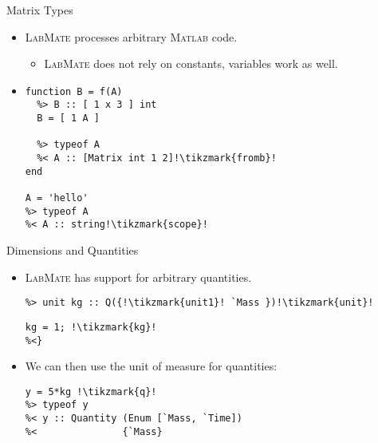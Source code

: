\documentclass[]{beamer}
\newcommand{\tikzmark}[1]{\tikz[overlay,remember picture,baseline=-0.5ex] \node (#1) {};}
\newcommand{\lm}{\textsc{LabMate}\xspace}
\newcommand{\ma}{\textsc{Matlab}\xspace}
\begin{document}
\begin{frame}[fragile]{Matrix Types}
  \begin{itemize}[<+->]
  \item \lm processes arbitrary \ma code.
    \smallskip
    \begin{itemize}
    \item \lm does not rely on constants, variables work as well.
    \end{itemize}
  \item
\begin{lstlisting}[xleftmargin=0em]
function B = f(A)
  %> B :: [ 1 x 3 ] int
  B = [ 1 A ]

  %> typeof A
  %< A :: [Matrix int 1 2]!\tikzmark{fromb}!
end

A = 'hello'
%> typeof A
%< A :: string!\tikzmark{scope}!
\end{lstlisting}
   \pause
  \end{itemize}
\end{frame}

\begin{frame}[fragile]{Dimensions and Quantities}
  \begin{itemize}[<+->]
  \item \lm has support for arbitrary quantities.
    \begin{lstlisting}[xleftmargin=0em,belowskip=-1em]
%> dimensions V for Q over `Mass!\tikzmark{base}!, `Time
%> unit kg :: Q({!\tikzmark{unit1}! `Mass })!\tikzmark{unit}!
\end{lstlisting}
\pause
\begin{lstlisting}[xleftmargin=0em]
%<{
kg = 1; !\tikzmark{kg}!
%<}
\end{lstlisting}
\pause
\pause
\item We can then use the unit of measure for quantities:
\begin{lstlisting}[xleftmargin=0em]
y = 5*kg !\tikzmark{q}!
%> typeof y
%< y :: Quantity (Enum [`Mass, `Time])
%<               {`Mass}
\end{lstlisting}
  \end{itemize}
\end{frame}
\end{document}
